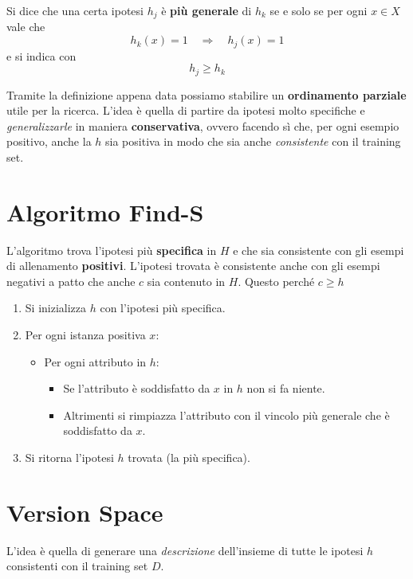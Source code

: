 \begin{definition}
	Si dice che una certa ipotesi $h_j$ \`e \textbf{pi\`u generale} di $h_k$ se e solo se per ogni $x \in X$ vale che
	\[ h_k(x) = 1 \quad \Rightarrow \quad h_j(x) = 1 \]
	e si indica con
	\[ h_j \geq h_k \]
\end{definition}

Tramite la definizione appena data possiamo stabilire un \textbf{ordinamento parziale} utile per la ricerca.
L'idea \`e quella di partire da ipotesi molto specifiche e \emph{generalizzarle} in maniera \textbf{conservativa},
ovvero facendo s\`i che, per ogni esempio positivo, anche la $h$ sia positiva in modo che sia anche \emph{consistente}
con il training set.

\section{Algoritmo Find-S}
L'algoritmo trova l'ipotesi pi\`u \textbf{specifica} in $H$ e che sia consistente con gli esempi di allenamento
\textbf{positivi}. L'ipotesi trovata \`e consistente anche con gli esempi negativi a patto che anche $c$ sia
contenuto in $H$. Questo perch\'e $c \geq h$
\begin{enumerate}
	\item Si inizializza $h$ con l'ipotesi pi\`u specifica.
	\item Per ogni istanza positiva $x$:
	      \begin{itemize}
		      \item Per ogni attributo in $h$:
		            \begin{itemize}
			            \item Se l'attributo \`e soddisfatto da $x$ in $h$ non si fa niente.
			            \item Altrimenti si rimpiazza l'attributo con il vincolo pi\`u generale che \`e soddisfatto da
			                  $x$.
		            \end{itemize}
	      \end{itemize}
	\item Si ritorna l'ipotesi $h$ trovata (la pi\`u specifica).
\end{enumerate}

\section{Version Space}
L'idea \`e quella di generare una \emph{descrizione} dell'insieme di tutte le ipotesi $h$ consistenti con il training
set $D$.

